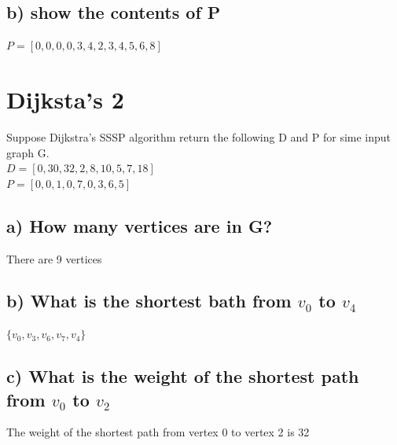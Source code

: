\documentclass[11pt]{article}
\begin{document}
\bigskip
\bigskip

\subsection*{b) show the contents of P}

\bigskip
\bigskip

\begin{center}
$P = [0, 0, 0, 0, 3, 4, 2, 3, 4, 5, 6, 8]$
\end{center}



\section{Dijksta's 2}
Suppose Dijkstra's SSSP algorithm return the following D and P for sime input graph G.\\
\noindent $D = [0, 30, 32, 2, 8, 10, 5, 7, 18]$ \\
\noindent $P = [0, 0, 1, 0, 7, 0, 3, 6, 5]$

\bigskip
\bigskip

\subsection*{a) How many vertices are in G?}

\bigskip
\bigskip
\begin{center}
There are 9 vertices
\end{center}

\bigskip
\bigskip

\subsection*{b) What is the shortest bath from $v_0$ to $v_4$}

\bigskip
\bigskip
\begin{center}
$\{ v_0, v_3, v_6, v_7, v_4 \}$
\end{center}

\bigskip
\bigskip

\subsection*{c) What is the weight of the shortest path from $v_0$ to $v_2$}

\bigskip
\bigskip

\begin{center}
The weight of the shortest path from vertex 0 to vertex 2 is 32
\end{center}





























\end{document}
